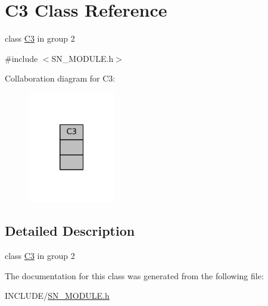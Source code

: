 \hypertarget{classC3}{}\section{C3 Class Reference}
\label{classC3}


class \hyperlink{classC3}{C3} in group 2  




{\ttfamily \#include $<$S\+N\+\_\+\+M\+O\+D\+U\+L\+E.\+h$>$}



Collaboration diagram for C3\+:
\nopagebreak
\begin{figure}[H]
\begin{center}
\leavevmode
\includegraphics[width=109pt]{classC3__coll__graph}
\end{center}
\end{figure}


\subsection{Detailed Description}
class \hyperlink{classC3}{C3} in group 2 

The documentation for this class was generated from the following file\+:\begin{DoxyCompactItemize}
\item 
I\+N\+C\+L\+U\+D\+E/\hyperlink{SN__MODULE_8h}{S\+N\+\_\+\+M\+O\+D\+U\+L\+E.\+h}\end{DoxyCompactItemize}
